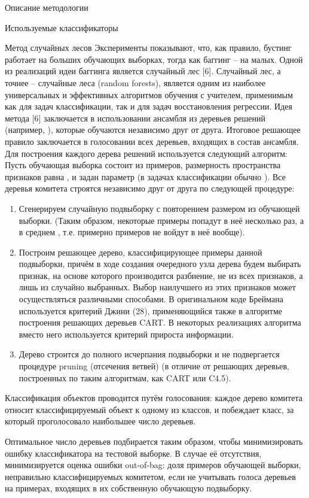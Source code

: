 \begin{section}{Описание методологии}
\begin{subsection}{Используемые классификаторы}
\begin{subsubsection}{Метод случайных лесов}
Эксперименты показывают, что, как правило, бустинг работает на больших обучающих выборках, тогда как баггинг – на малых.
Одной из реализаций идеи баггинга является случайный лес [6].
Случайный лес, а точнее – случайные леса (random forests), является одним из наиболее универсальных и эффективных алгоритмов обучения с учителем, применимым как для задач классификации, так и для задач восстановления регрессии. Идея метода [6] заключается в использовании ансамбля из  деревьев решений (например, ), которые обучаются независимо друг от друга. Итоговое решающее правило заключается в голосовании всех деревьев, входящих в состав ансамбля.
Для построения каждого дерева решений используется следующий алгоритм:
Пусть обучающая выборка состоит из  примеров, размерность пространства признаков равна , и задан параметр  (в задачах классификации обычно ).
Все деревья комитета строятся независимо друг от друга по следующей процедуре:
\begin{enumerate}
  \item Сгенерируем случайную подвыборку с повторением размером  из обучающей выборки. (Таким образом, некоторые примеры попадут в неё несколько раз, а в среднем , т.е. примерно  примеров не войдут в неё вообще).
  \item Построим решающее дерево, классифицирующее примеры данной подвыборки, причём в ходе создания очередного узла дерева будем выбирать признак, на основе которого производится разбиение, не из всех  признаков, а лишь из  случайно выбранных. Выбор наилучшего из этих  признаков может осуществляться различными способами. В оригинальном коде Бреймана используется критерий Джини (28), применяющийся также в алгоритме построения решающих деревьев CART. В некоторых реализациях алгоритма вместо него используется критерий прироста информации.
  \item Дерево строится до полного исчерпания подвыборки и не подвергается процедуре pruning (отсечения ветвей) (в отличие от решающих деревьев, построенных по таким алгоритмам, как CART или C4.5).
\end{enumerate}

Классификация объектов проводится путём голосования: каждое дерево комитета относит классифицируемый объект к одному из классов, и побеждает класс, за который проголосовало наибольшее число деревьев.

Оптимальное число деревьев подбирается таким образом, чтобы минимизировать ошибку классификатора на тестовой выборке. В случае её отсутствия, минимизируется оценка ошибки out-of-bag: доля примеров обучающей выборки, неправильно классифицируемых комитетом, если не учитывать голоса деревьев на примерах, входящих в их собственную обучающую подвыборку.


\end{subsubsection}
\end{subsection}
\end{section}
